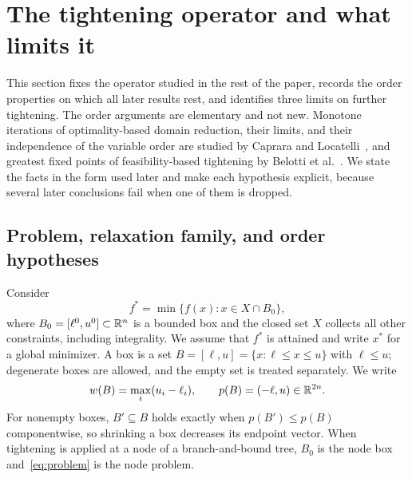 \section{The tightening operator and what limits it}\label{sec:foundations}

This section fixes the operator studied in the rest of the paper, records
the order properties on which all later results rest, and identifies three
limits on further tightening. The order arguments are
elementary and not new. Monotone iterations of optimality-based domain
reduction, their limits, and their independence of the variable order are
studied by Caprara and
Locatelli~\cite{caprara2010-global-optimization-problems-and-domain}, and
greatest fixed points of feasibility-based tightening by Belotti et
al.~\cite{belotti2010-feasibility-based-bounds-tightening-via-fixed-points,belotti2012fbbt}. We state the facts in the form used later and
make each hypothesis explicit, because several later conclusions fail when
one of them is dropped.

\subsection{Problem, relaxation family, and order hypotheses}

Consider
\begin{equation}\label{eq:problem}
  f^*=\min\{f(x):x\in X\cap B_0\},
\end{equation}
where $B_0=[\ell^0,u^0]\subset\mathbb{R}^n$ is a bounded box and the closed set $X$
collects all other constraints, including integrality. We assume that
$f^*$ is attained and write $x^*$ for a global minimizer. A box is a set
$B=[\ell,u]=\{x:\ell\le x\le u\}$ with $\ell\le u$; degenerate boxes are
allowed, and the empty set is treated separately. We write
\[
  w(B)=\max_i(u_i-\ell_i),\qquad p(B)=(-\ell,u)\in\mathbb{R}^{2n}.
\]
For nonempty boxes, $B'\subseteq B$ holds exactly when $p(B')\le p(B)$
componentwise, so shrinking a box decreases its endpoint vector. When
tightening is applied at a node of a branch-and-bound tree, $B_0$ is the
node box and~\eqref{eq:problem} is the node problem.

